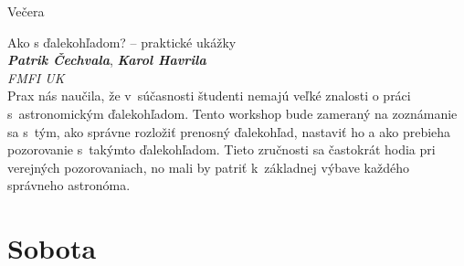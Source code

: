 \documentclass[a4paper]{report}
\begin{document}
                    \begin{tcolorbox}[
                                    colback=red!10,
                    colframe=red!50!black,
                                fonttitle=\Large\bfseries,
                title=19:00
            ]
                {\Large Večera}
                                                            \end{tcolorbox}
                    \begin{tcolorbox}[
                                    colback=blue!10,
                    colframe=black!50!blue,
                                fonttitle=\Large\bfseries,
                title=21:00
            ]
                {\Large Ako s ďalekohľadom? -- praktické ukážky}
                                                            \\ \textit{\textbf{Patrik Čechvala}}, \textit{\textbf{Karol Havrila}}                                                    \\ \textit{FMFI UK}                \\[2ex]Prax nás naučila, že v súčasnosti študenti nemajú veľké znalosti o práci s astronomickým ďalekohľadom. Tento workshop bude zameraný na zoznámanie sa s tým, ako správne rozložiť prenosný ďalekohľad, nastaviť ho a ako prebieha pozorovanie s takýmto ďalekohľadom. Tieto zručnosti sa častokrát hodia pri verejných pozorovaniach, no mali by patriť k základnej výbave každého správneho astronóma.
            \end{tcolorbox}
                    \section{Sobota}
\end{document}
